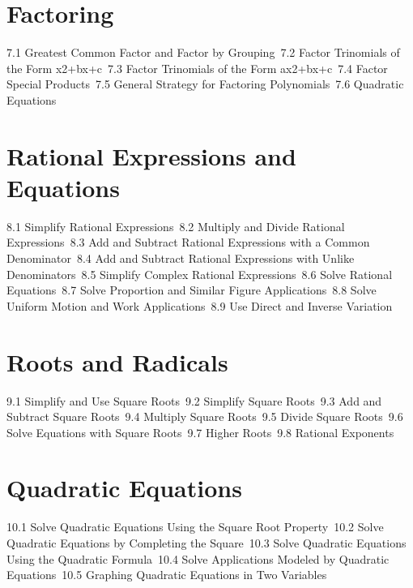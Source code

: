 \section{Factoring}
7.1 Greatest Common Factor and Factor by Grouping\
7.2 Factor Trinomials of the Form x2+bx+c\
7.3 Factor Trinomials of the Form ax2+bx+c\
7.4 Factor Special Products\
7.5 General Strategy for Factoring Polynomials\
7.6 Quadratic Equations\
\section{Rational Expressions and Equations}
8.1 Simplify Rational Expressions\
8.2 Multiply and Divide Rational Expressions\
8.3 Add and Subtract Rational Expressions with a Common Denominator\
8.4 Add and Subtract Rational Expressions with Unlike Denominators\
8.5 Simplify Complex Rational Expressions\
8.6 Solve Rational Equations\
8.7 Solve Proportion and Similar Figure Applications\
8.8 Solve Uniform Motion and Work Applications\
8.9 Use Direct and Inverse Variation\
\section{Roots and Radicals}
9.1 Simplify and Use Square Roots\
9.2 Simplify Square Roots\
9.3 Add and Subtract Square Roots\
9.4 Multiply Square Roots\
9.5 Divide Square Roots\
9.6 Solve Equations with Square Roots\
9.7 Higher Roots\
9.8 Rational Exponents\
\section{Quadratic Equations}
10.1 Solve Quadratic Equations Using the Square Root Property\
10.2 Solve Quadratic Equations by Completing the Square\
10.3 Solve Quadratic Equations Using the Quadratic Formula\
10.4 Solve Applications Modeled by Quadratic Equations\
10.5 Graphing Quadratic Equations in Two Variables\
